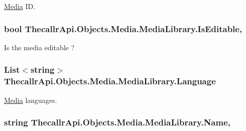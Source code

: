 \hyperlink{namespace_thecallr_api_1_1_objects_1_1_media}{Media} I\+D. 

\hypertarget{class_thecallr_api_1_1_objects_1_1_media_1_1_media_library_a50f729122a6bf39e5f776e01978ddf8b}{
\subsubsection[{Is\+Editable}]{\setlength{\rightskip}{0pt plus 5cm}bool Thecallr\+Api.\+Objects.\+Media.\+Media\+Library.\+Is\+Editable\hspace{0.3cm}{\ttfamily [get]}, {\ttfamily [set]}}}\label{class_thecallr_api_1_1_objects_1_1_media_1_1_media_library_a50f729122a6bf39e5f776e01978ddf8b}


Is the media editable ? 

\hypertarget{class_thecallr_api_1_1_objects_1_1_media_1_1_media_library_aab1314d4f77d95a5257c3e7c1096d908}{
\subsubsection[{Language}]{\setlength{\rightskip}{0pt plus 5cm}List$<$string$>$ Thecallr\+Api.\+Objects.\+Media.\+Media\+Library.\+Language\hspace{0.3cm}{\ttfamily [get]}}}\label{class_thecallr_api_1_1_objects_1_1_media_1_1_media_library_aab1314d4f77d95a5257c3e7c1096d908}


\hyperlink{namespace_thecallr_api_1_1_objects_1_1_media}{Media} languages. 

\hypertarget{class_thecallr_api_1_1_objects_1_1_media_1_1_media_library_ac7d3e1a5654d0f64d19d680d0443a633}{
\subsubsection[{Name}]{\setlength{\rightskip}{0pt plus 5cm}string Thecallr\+Api.\+Objects.\+Media.\+Media\+Library.\+Name\hspace{0.3cm}{\ttfamily [get]}, {\ttfamily [set]}}}\label{class_thecallr_api_1_1_objects_1_1_media_1_1_media_library_ac7d3e1a5654d0f64d19d680d0443a633}



